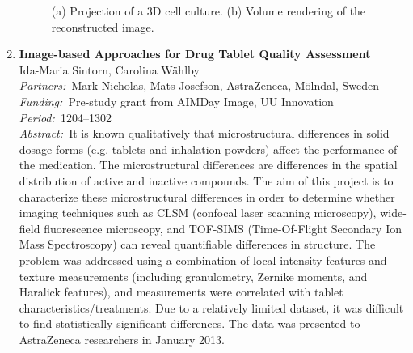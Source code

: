 \documentclass[10pt, a4paper]{article}
\newcommand{\aabstract}[1]{\emph{Abstract:~}#1}
\newcommand{\ffunding}[1]{\emph{Funding:~}#1\\}
\newcommand{\ppartners}[1]{\emph{Partners:~}#1\\}
\newcommand{\pperiod}[1]{\emph{Period:~}#1\\}
\begin{document}
\begin{enumerate}
\begin{figure}[!htbp]
\centering
{}
\caption{(a) Projection of a 3D cell culture. (b) Volume rendering of the reconstructed image.}
\label{fig::tomography_cell}
\end{figure}

\item 
\textbf{Image-based Approaches for Drug Tablet Quality Assessment}\\
Ida-Maria Sintorn, Carolina W\"{a}hlby\\
\ppartners{Mark Nicholas, Mats Josefson, AstraZeneca, M\"{o}lndal, Sweden}
\ffunding{Pre-study grant from AIMDay Image, UU Innovation}
\pperiod{1204--1302}
\aabstract{It is known qualitatively that microstructural differences in solid dosage forms (e.g. tablets and inhalation powders) affect the performance of the medication. The microstructural differences are differences in the spatial distribution of active and inactive compounds. The aim of this project is to characterize these microstructural differences in order to determine whether imaging techniques such as CLSM (confocal laser scanning microscopy), wide-field fluorescence microscopy, and TOF-SIMS (Time-Of-Flight Secondary Ion Mass Spectroscopy) can reveal quantifiable differences in structure.  The problem was addressed using a combination of local intensity features and texture measurements (including granulometry, Zernike moments, and Haralick features), and measurements were correlated with tablet characteristics/treatments. Due to a relatively limited dataset, it was difficult to find statistically significant differences. The data was presented to AstraZeneca researchers in January 2013.}


\end{enumerate}
\end{document}
